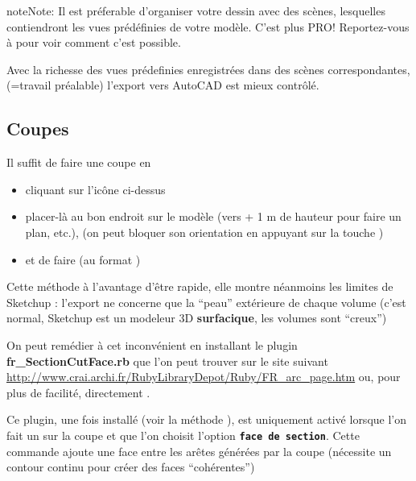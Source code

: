 \documentclass[a4paper,12pt,french]{sphinxmanual}
\begin{document}
\begin{notice}{note}{Note:}
Il est préferable d'organiser votre dessin avec des scènes, lesquelles contiendront les vues prédéfinies de votre modèle. C'est plus PRO! Reportez-vous à {\hyperref[su/creation\string-scenes:creation\string-scenes]{}} pour voir comment c'est possible.
\end{notice}

Avec la richesse des vues prédefinies enregistrées dans des scènes correspondantes, (=travail préalable) l'export vers AutoCAD est mieux contrôlé.
\begin{figure}[htbp]
\centering

\noindent{}
\end{figure}


\subsection{Coupes}
\label{su/export-dwg:coupes}\label{su/export-dwg:export-dwg-coupes}
Il suffit de faire une coupe en
\begin{itemize}
\item {} 
cliquant sur l'icône ci-dessus

\item {} 
placer-là au bon endroit sur le modèle (vers + 1 m de hauteur pour faire un plan, etc.), (on peut bloquer son orientation en appuyant sur la touche  )

\item {} 
et de faire  (au format )

\end{itemize}

Cette méthode à l'avantage d'être rapide, elle montre néanmoins les limites de Sketchup : l'export ne concerne que la ``peau'' extérieure de chaque volume (c'est normal, Sketchup est un modeleur 3D \textbf{surfacique}, les volumes sont ``creux'')

On peut remédier à cet inconvénient en installant le plugin \textbf{fr\_SectionCutFace.rb} que l'on peut trouver sur le site suivant \url{http://www.crai.archi.fr/RubyLibraryDepot/Ruby/FR\_arc\_page.htm} ou, pour plus de facilité, directement  .

Ce plugin, une fois installé (voir la méthode {\hyperref[su/install\string-plugin\string-su:install\string-plugin\string-su]{}}), est uniquement activé lorsque l'on fait un  sur la coupe et que l'on choisit l'option \textbf{\texttt{face de section}}. Cette commande ajoute une face entre les arêtes générées par la coupe (nécessite un contour continu pour créer des faces ``cohérentes'')
\end{document}
